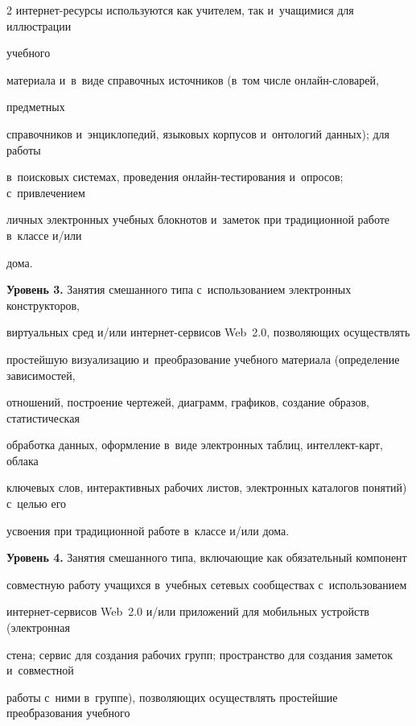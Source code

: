 \begin{multicols}{2}
ин\-тер\-нет-ре\-сур\-сы используются как учителем, так и~учащимися для иллюстрации


учебного


материала и~в~виде справочных источников (в~том чис\-ле он\-лайн-сло\-ва\-рей,


предметных


справочников и~энциклопедий, языковых корпусов и~онтологий данных); для работы


в~поисковых сис\-те\-мах, проведения он\-лайн-тес\-ти\-ро\-ва\-ния и~опросов; с~привлечением


личных электронных учебных блокнотов и~заметок при традиционной работе в~классе и/или


дома.





\smallskip





  \textbf{Уровень 3.} Занятия смешанного типа с~использованием электронных конструкторов,


виртуальных сред и/или ин\-тер\-нет-сер\-ви\-сов Web~2.0, позволяющих осуществлять


простейшую визуализацию и~преобразование учебного материала (определение зависимостей,


отношений, построение чертежей, диаграмм, графиков, создание образов, статистическая


обработка данных, оформление в~виде электронных таблиц, ин\-тел\-лект-карт, облака


ключевых слов, интерактивных рабочих листов, электронных каталогов понятий) с~целью его


усвоения при традиционной работе в~классе и/или дома.





\smallskip





  \textbf{Уровень 4.} Занятия смешанного типа, включающие как обязательный компонент


совместную работу учащихся в~учебных сетевых сообществах с~использованием


  ин\-тер\-нет-сер\-ви\-сов Web~2.0 и/или приложений для мобильных устройств (электронная


стена; сервис для создания рабочих групп; пространство для создания заметок и~совместной


работы с~ними в~группе), позволяющих осуществлять простейшие преобразования учебного



\end{multicols}
